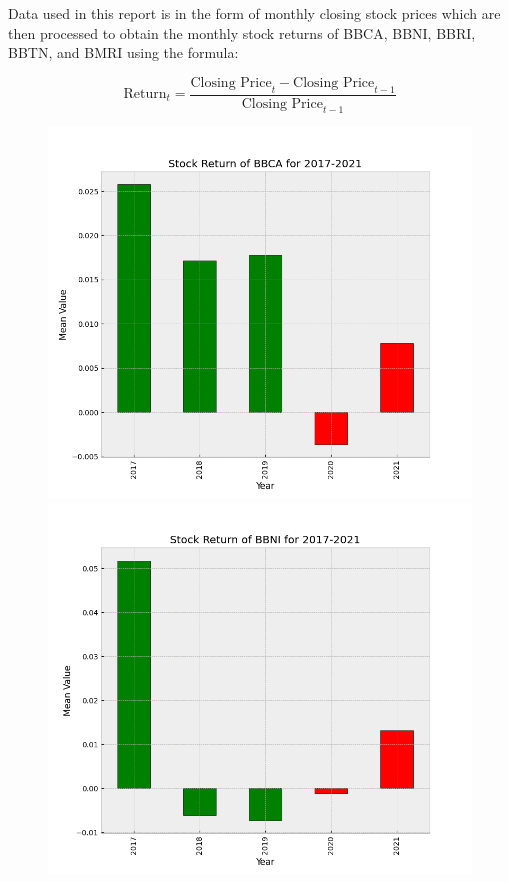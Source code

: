 Data used in this report is in the form of monthly closing stock prices which are then processed to obtain the monthly stock returns of BBCA, BBNI, BBRI, BBTN, and BMRI using the formula:

$$
\text{Return}_{t} = \frac{\text{Closing Price}_{t} - \text{Closing Price}_{t-1}}{\text{Closing Price}_{t-1}}
$$

\begin{figure}[H]
    \includegraphics[width = .55\textwidth ]{figures/BBCA.png}
    \includegraphics[width = .55\textwidth ]{figures/BBNI.png}
\end{figure}

